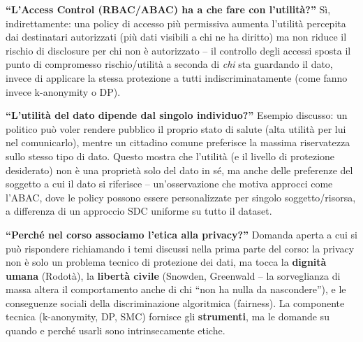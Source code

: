 \documentclass[a4paper,11pt]{article}
\begin{document}
\textbf{``L'Access Control (RBAC/ABAC) ha a che fare con l'utilit\`{a}?''} Sì, indirettamente: una policy di accesso pi\`{u} permissiva aumenta l'utilit\`{a} percepita dai destinatari autorizzati (pi\`{u} dati visibili a chi ne ha diritto) ma non riduce il rischio di disclosure per chi non \`{e} autorizzato -- il controllo degli accessi sposta il punto di compromesso rischio/utilit\`{a} a seconda di \emph{chi} sta guardando il dato, invece di applicare la stessa protezione a tutti indiscriminatamente (come fanno invece k-anonymity o DP).

\textbf{``L'utilit\`{a} del dato dipende dal singolo individuo?''} Esempio discusso: un politico pu\`{o} voler rendere pubblico il proprio stato di salute (alta utilit\`{a} per lui nel comunicarlo), mentre un cittadino comune preferisce la massima riservatezza sullo stesso tipo di dato. Questo mostra che l'utilit\`{a} (e il livello di protezione desiderato) non \`{e} una proprietà solo del dato in s\'{e}, ma anche delle preferenze del soggetto a cui il dato si riferisce -- un'osservazione che motiva approcci come l'ABAC, dove le policy possono essere personalizzate per singolo soggetto/risorsa, a differenza di un approccio SDC uniforme su tutto il dataset.

\textbf{``Perch\'{e} nel corso associamo l'etica alla privacy?''} Domanda aperta a cui si pu\`{o} rispondere richiamando i temi discussi nella prima parte del corso: la privacy non \`{e} solo un problema tecnico di protezione dei dati, ma tocca la \textbf{dignit\`{a} umana} (Rodot\`{a}), la \textbf{libert\`{a} civile} (Snowden, Greenwald -- la sorveglianza di massa altera il comportamento anche di chi ``non ha nulla da nascondere''), e le conseguenze sociali della discriminazione algoritmica (fairness). La componente tecnica (k-anonymity, DP, SMC) fornisce gli \textbf{strumenti}, ma le domande su quando e perch\'{e} usarli sono intrinsecamente etiche.
\end{document}
